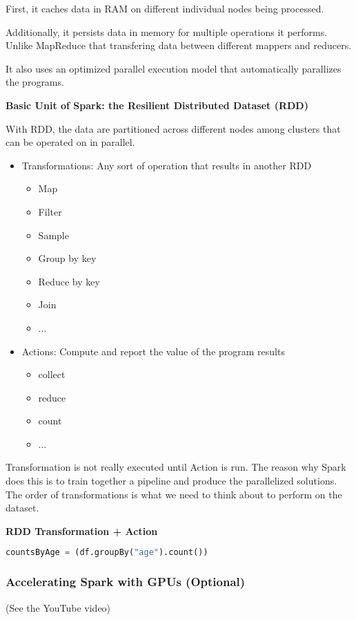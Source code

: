 \documentclass{article}
\begin{document}
First, it caches data in RAM on different individual nodes being processed.

Additionally, it persists data in memory for multiple operations it performs. Unlike MapReduce that transfering data between different mappers and reducers.

It also uses an optimized parallel execution model that automatically parallizes the programs.

\textbf{Basic Unit of Spark: the Resilient Distributed Dataset (RDD)}

With RDD, the data are partitioned across different nodes among clusters that can be operated on in parallel.

\begin{itemize}
    \item Transformations: Any sort of operation that results in another RDD
    \begin{itemize}
        \item Map
        \item Filter
        \item Sample
        \item Group by key
        \item Reduce by key
        \item Join
        \item ...
    \end{itemize}
    \item Actions: Compute and report the value of the program results
    \begin{itemize}
        \item collect
        \item reduce
        \item count
        \item ...
    \end{itemize}
\end{itemize}

Transformation is not really executed until Action is run. The reason why Spark does this is to train together a pipeline and produce the parallelized solutions. The order of transformations is what we need to think about to perform on the dataset.

\textbf{RDD Transformation + Action}
\begin{lstlisting}[language=Python]
countsByAge = (df.groupBy("age").count())
\end{lstlisting}

\subsubsection{Accelerating Spark with GPUs (Optional)} (See the YouTube video)
\end{document}

